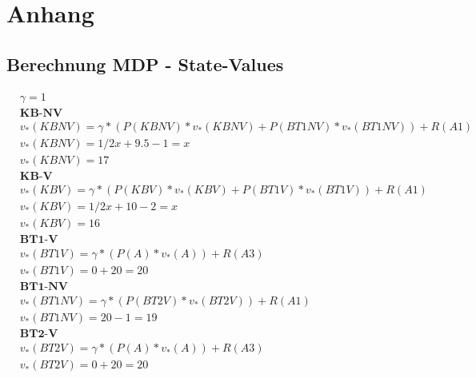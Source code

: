 \appendix
\chapter{Anhang}
\label{sec:Anhang}
\section{Berechnung MDP - State-Values}
\label{appendix:state-values}
\begin{align}
&\gamma=1\nonumber\\
&\textbf{KB-NV} \nonumber\\
&v_*(KBNV) =\gamma *( P(KBNV)* v_*(KBNV)+ P(BT1NV)* v_*(BT1NV))+R(A1) \nonumber \\
&v_*(KBNV)= 1/2x +  9.5 -1= x \nonumber\\
&v_*(KBNV)= 17\\
&\textbf{KB-V} \nonumber\\
&v_*(KBV)= \gamma *(P(KBV)* v_*(KBV)+ P(BT1V)* v_*(BT1V)) + R(A1) \nonumber \\
&v_*(KBV)= 1/2x +  10-2 = x \nonumber\\
&v_*(KBV)= 16\\
&\textbf{BT1-V} \nonumber\\
&v_*(BT1V)= \gamma *(P(A)* v_*(A)) + R(A3) \nonumber \\
&v_*(BT1V)= 0 +20 = 20\\
&\textbf{BT1-NV} \nonumber\\
&v_*(BT1NV) = \gamma *(P(BT2V)* v_*(BT2V))+R(A1) \nonumber \\
&v_*(BT1NV) = 20 -1= 19\\
&\textbf{BT2-V} \nonumber\\
&v_*(BT2V)= \gamma *(P(A)* v_*(A)) + R(A3) \nonumber \\
&v_*(BT2V)= 0 +20 = 20
\end{align}

